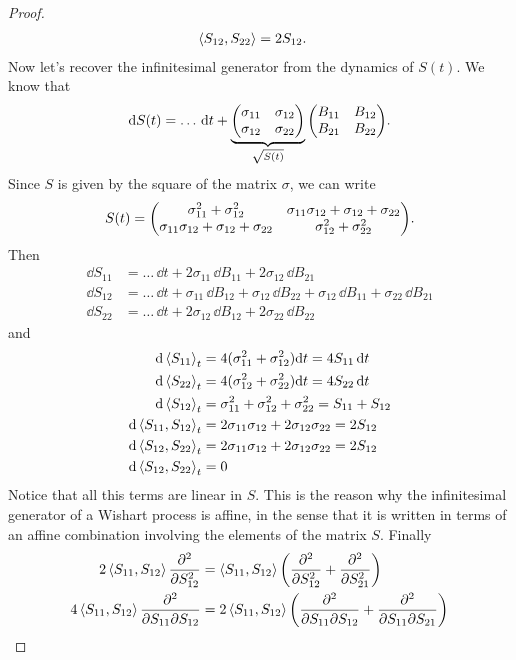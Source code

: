 \begin{proof}
\begin{align*}
        \expval{S_{12},S_{22}} &= 2S_{12}.
    \end{align*}
    Now let's recover the infinitesimal generator from the dynamics of $S(t)$. We know that
    \begin{equation*}
        \dd S(t) = \dots\,\dd t + \underbrace{\mqty(\sigma_{11} & \sigma_{12} \\ \sigma_{12} & \sigma_{22})}_{\sqrt{S(t)}}\mqty(B_{11} & B_{12} \\ B_{21} & B_{22}).
    \end{equation*}
    Since $S$ is given by the square of the matrix $\sigma$, we can write
    \begin{equation*}
        S(t) = \mqty(\sigma_{11}^2+\sigma_{12}^2 & \sigma_{11}\sigma_{12}+\sigma_{12}+\sigma_{22} \\ \sigma_{11}\sigma_{12}+\sigma_{12}+\sigma_{22} & \sigma_{12}^2+\sigma_{22}^2).
    \end{equation*}
    Then
    \begin{align*}
        \dd S_{11} &= \dots\,\dd t + 2\sigma_{11}\,\dd B_{11} + 2\sigma_{12}\,\dd B_{21} \\
        \dd S_{12} &= \dots\,\dd t + \sigma_{11}\,\dd B_{12} + \sigma_{12}\,\dd B_{22} + \sigma_{12}\,\dd B_{11} + \sigma_{22}\,\dd B_{21} \\
        \dd S_{22} &= \dots\,\dd t + 2\sigma_{12}\,\dd B_{12} + 2\sigma_{22}\,\dd B_{22}
    \end{align*}
    and
    \begin{align*}
        \dd\expval{S_{11}}_t &= 4(\sigma_{11}^2 + \sigma_{12}^2)\dd t = 4S_{11}\,\dd t \\
        \dd\expval{S_{22}}_t &= 4(\sigma_{12}^2 + \sigma_{22}^2)\dd t = 4S_{22}\,\dd t \\
        \dd\expval{S_{12}}_t &= \sigma_{11}^2 + \sigma_{12}^2 + \sigma_{22}^2 = S_{11} + S_{12} \\
        \dd\expval{S_{11},S_{12}}_t &= 2\sigma_{11}\sigma_{12} + 2\sigma_{12}\sigma_{22} = 2S_{12} \\
        \dd\expval{S_{12},S_{22}}_t &= 2\sigma_{11}\sigma_{12} + 2\sigma_{12}\sigma_{22} = 2S_{12} \\
        \dd\expval{S_{12},S_{22}}_t &= 0
    \end{align*}
    Notice that all this terms are linear in $S$. This is the reason why the infinitesimal generator of a Wishart process is affine, in the sense that it is written in terms of an affine combination involving the elements of the matrix $S$. Finally
    \begin{align*}
        2\expval{S_{11},S_{12}}\pdv[2]{}{S_{12}} &= \expval{S_{11},S_{12}}\left(\pdv[2]{}{S_{12}}+\pdv[2]{}{S_{21}}\right) \\
        4\expval{S_{11},S_{12}}\pdv{}{S_{11}}{S_{12}} &= 2\expval{S_{11},S_{12}}\left(\pdv{}{S_{11}}{S_{12}}+\pdv{}{S_{11}}{S_{21}}\right)
    \end{align*}
\end{proof}
